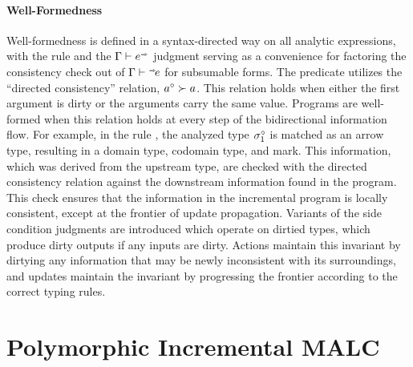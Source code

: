 \paragraph{Well-Formedness} Well-formedness is defined in a syntax-directed way on all analytic expressions, with the  rule and the $\WFU{\EUV}$ judgment serving as a convenience for factoring the consistency check out of $\WFL{\ELV}$ for subsumable forms. The predicate utilizes the ``directed consistency'' relation, $a^{\circ}\succ a$. This relation holds when either the first argument is dirty or the arguments carry the same value. Programs are well-formed when this relation holds at every step of the bidirectional information flow. For example, in the rule , the analyzed type $\sigma^{\circ}_1$ is matched as an arrow type, resulting in a domain type, codomain type, and mark. This information, which was derived from the upstream type, are checked with the directed consistency relation against the downstream information found in the program. This check ensures that the information in the incremental program is locally consistent, except at the frontier of update propagation. Variants of the side condition judgments are introduced which operate on dirtied types, which produce dirty outputs if any inputs are dirty. Actions maintain this invariant by dirtying any information that may be newly inconsistent with its surroundings, and updates maintain the invariant by progressing the frontier according to the correct typing rules.

\FloatBarrier

\section{Polymorphic Incremental MALC}
\label{subsec:appendix-polymorphism}


